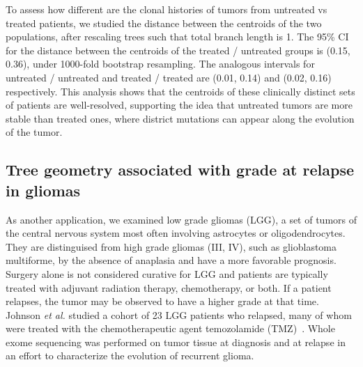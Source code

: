 \documentclass[a4paper,11pt]{article}
\begin{document}
To assess how different are the clonal histories of tumors from untreated vs treated patients, we studied the distance between the centroids of the two populations, after rescaling trees such that total branch length is 1.
The 95\% CI for the distance between the centroids of the treated / untreated groups is (0.15, 0.36), under 1000-fold bootstrap resampling.
The analogous intervals for untreated / untreated and treated / treated are (0.01, 0.14) and (0.02, 0.16) respectively.
This analysis shows that the centroids of these clinically distinct sets of patients are well-resolved, supporting the idea that untreated tumors are more stable than treated ones, where district mutations can appear along the evolution of the tumor.

\subsection{Tree geometry associated with grade at relapse in gliomas}\label{sec:glioma}

As another application, we examined low grade gliomas (LGG), a set of tumors of the central nervous system most often involving astrocytes or oligodendrocytes.
They are distinguised from high grade gliomas (III, IV), such as glioblastoma multiforme, by the absence of anaplasia and have a more favorable prognosis.
Surgery alone is not considered curative for LGG and patients are typically treated with adjuvant radiation therapy, chemotherapy, or both.
If a patient relapses, the tumor may be observed to have a higher grade at that time.
Johnson \textit{et al.} studied a cohort of 23 LGG patients who relapsed, many of whom were treated with the chemotherapeutic agent temozolamide (TMZ)~\cite{johnson2014mutational}.
Whole exome sequencing was performed on tumor tissue at diagnosis and at relapse in an effort to characterize the evolution of recurrent glioma.
\end{document}
